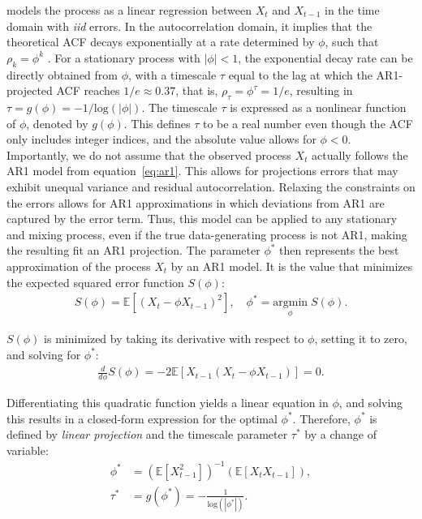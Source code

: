 \documentclass[docs/main.tex]{subfiles}
\begin{document}
\noindent models the process as a linear regression between $X_t$ and $X_{t-1}$ in the time domain with \textit{iid} errors. In the autocorrelation domain, it implies that the theoretical ACF decays exponentially at a rate determined by $\phi$, such that $\rho_k = \phi^k$ \citep[Chapter~14.22]{hansen_econometrics_2022}. For a stationary process with $|\phi|<1$, the exponential decay rate can be directly obtained from $\phi$, with a timescale $\tau$ equal to the lag at which the AR1-projected ACF reaches $1/e\approx 0.37$, that is,  $\rho_\tau = \phi^\tau = 1/e$, resulting in $\tau = g(\phi) = -1/\text{log}(|\phi|)$. The timescale $\tau$ is expressed as a nonlinear function of $\phi$, denoted by $g(\phi)$. This defines $\tau$ to be a real number even though the ACF only includes integer indices, and the absolute value allows for $\phi<0$.\\

Importantly, we do not assume that the observed process $X_t$ actually follows the AR1 model from equation~\eqref{eq:ar1}. This allows for projections errors that may exhibit unequal variance and residual autocorrelation. Relaxing the constraints on the errors allows for AR1 approximations in which deviations from AR1 are captured by the error term. Thus, this model can be applied to any stationary and mixing process, even if the true data-generating process is not AR1, making the resulting fit an AR1 projection. The parameter $\phi^*$ then represents the best approximation of the process $X_t$ by an AR1 model. It is the value that minimizes the expected squared error function $S(\phi)$:
\begin{align}
    S(\phi) = \mathbb{E}[(X_t - \phi X_{t-1})^2],\quad \phi^* = \underset{\phi}{\text{argmin}} \; S(\phi).
\end{align}

\noindent $S(\phi)$ is minimized by taking its derivative with respect to $\phi$, setting it to zero, and solving for $\phi^*$:
\begin{align}
    \frac{d}{d\phi} S(\phi) = -2 \mathbb{E}[X_{t-1}(X_t - \phi X_{t-1})] = 0.
\end{align}

\noindent Differentiating this quadratic function yields a linear equation in $\phi$, and solving this results in a closed-form expression for the optimal $\phi^*$. Therefore, $\phi^*$ is defined by \textit{linear projection} and the timescale parameter $\tau^*$ by a change of variable:
\begin{align}
    \phi^* &= (\mathbb{E}[X_{t-1}^2])^{-1}(\mathbb{E}[X_t X_{t-1}]) \label{eq:ar1-phi},\\
    \tau^* &= g(\phi^*) = -\frac{1}{\text{log}(|\phi^*|)}. \label{eq:ar1-tau}
\end{align}
\end{document}
